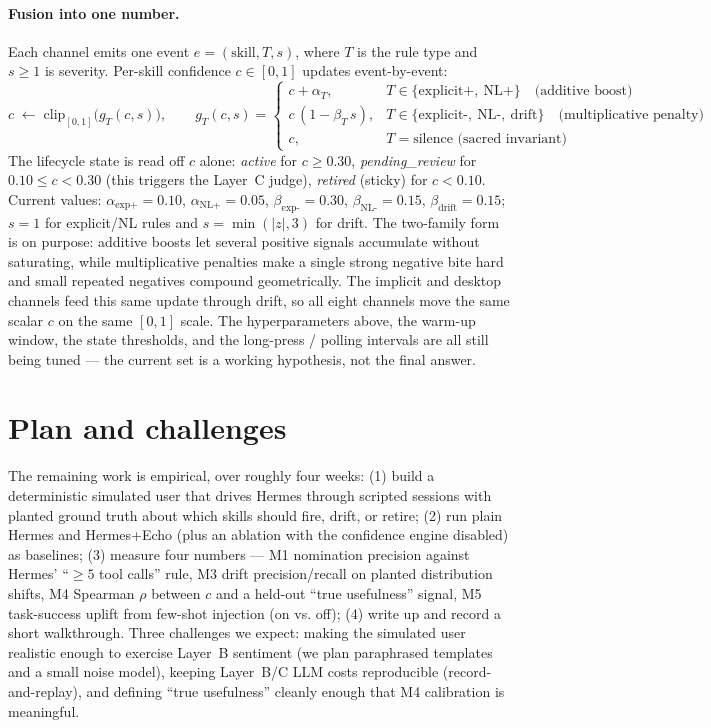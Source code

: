 \documentclass[12pt,a4paper]{article}
\theoremstyle{plain}
\theoremstyle{definition}
\theoremstyle{remark}
\begin{document}
			\paragraph{Fusion into one number.} Each channel emits one event $e = (\text{skill}, T, s)$, where $T$ is the rule type and $s \geq 1$ is severity. Per-skill confidence $c \in [0,1]$ updates event-by-event:
			\[
				c \;\leftarrow\; \mathrm{clip}_{[0,1]}\bigl(g_T(c,s)\bigr),\qquad
				g_T(c,s) =
				\begin{cases}
					c + \alpha_T, & T \in \{\text{explicit+},\ \text{NL+}\} \quad \text{(additive boost)} \\
					c\,(1 - \beta_T\, s), & T \in \{\text{explicit-},\ \text{NL-},\ \text{drift}\} \quad \text{(multiplicative penalty)} \\
					c, & T = \text{silence (sacred invariant)}
				\end{cases}
			\]
			The lifecycle state is read off $c$ alone: \emph{active} for $c \geq 0.30$, \emph{pending\_review} for $0.10 \leq c < 0.30$ (this triggers the Layer~C judge), \emph{retired} (sticky) for $c < 0.10$. Current values: $\alpha_{\text{exp+}}{=}0.10$, $\alpha_{\text{NL+}}{=}0.05$, $\beta_{\text{exp-}}{=}0.30$, $\beta_{\text{NL-}}{=}0.15$, $\beta_{\text{drift}}{=}0.15$; $s{=}1$ for explicit/NL rules and $s{=}\min(|z|, 3)$ for drift. The two-family form is on purpose: additive boosts let several positive signals accumulate without saturating, while multiplicative penalties make a single strong negative bite hard and small repeated negatives compound geometrically. The implicit and desktop channels feed this same update through drift, so all eight channels move the same scalar $c$ on the same $[0,1]$ scale. The hyperparameters above, the warm-up window, the state thresholds, and the long-press / polling intervals are all still being tuned --- the current set is a working hypothesis, not the final answer.

			\section{Plan and challenges}

			The remaining work is empirical, over roughly four weeks: (1) build a deterministic simulated user that drives Hermes through scripted sessions with planted ground truth about which skills should fire, drift, or retire; (2) run plain Hermes and Hermes+Echo (plus an ablation with the confidence engine disabled) as baselines; (3) measure four numbers --- M1 nomination precision against Hermes' ``$\geq 5$ tool calls'' rule, M3 drift precision/recall on planted distribution shifts, M4 Spearman $\rho$ between $c$ and a held-out ``true usefulness'' signal, M5 task-success uplift from few-shot injection (on vs. off); (4) write up and record a short walkthrough. Three challenges we expect: making the simulated user realistic enough to exercise Layer~B sentiment (we plan paraphrased templates and a small noise model), keeping Layer~B/C LLM costs reproducible (record-and-replay), and defining ``true usefulness'' cleanly enough that M4 calibration is meaningful.

		
\end{document}
